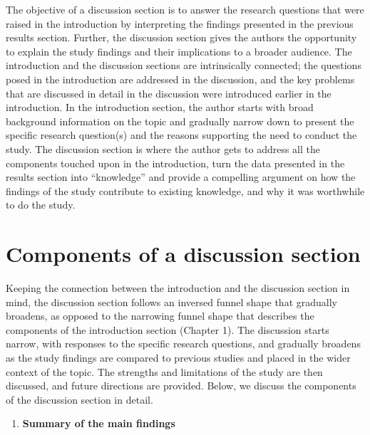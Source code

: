 \documentclass[
]{book}
\providecommand{\tightlist}{%
  \setlength{\itemsep}{0pt}\setlength{\parskip}{0pt}}
\begin{document}
The objective of a discussion section is to answer the research questions that were raised in the introduction by interpreting the findings presented in the previous results section. Further, the discussion section gives the authors the opportunity to explain the study findings and their implications to a broader audience. The introduction and the discussion sections are intrinsically connected; the questions posed in the introduction are addressed in the discussion, and the key problems that are discussed in detail in the discussion were introduced earlier in the introduction. In the introduction section, the author starts with broad background information on the topic and gradually narrow down to present the specific research question(s) and the reasons supporting the need to conduct the study. The discussion section is where the author gets to address all the components touched upon in the introduction, turn the data presented in the results section into ``knowledge'' and provide a compelling argument on how the findings of the study contribute to existing knowledge, and why it was worthwhile to do the study.

\hypertarget{components-of-a-discussion-section}{%
\section{Components of a discussion section}\label{components-of-a-discussion-section}}

Keeping the connection between the introduction and the discussion section in mind, the discussion section follows an inversed funnel shape that gradually broadens, as opposed to the narrowing funnel shape that describes the components of the introduction section (Chapter 1). The discussion starts narrow, with responses to the specific research questions, and gradually broadens as the study findings are compared to previous studies and placed in the wider context of the topic. The strengths and limitations of the study are then discussed, and future directions are provided. Below, we discuss the components of the discussion section in detail.

\begin{enumerate}
\def\labelenumi{\arabic{enumi}.}
\tightlist
\item
  \textbf{Summary of the main findings}
\end{enumerate}
\end{document}
